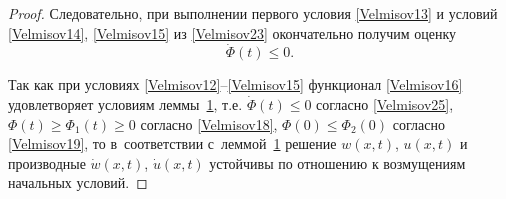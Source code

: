 \begin{proof}
Следовательно, при выполнении первого условия \eqref{Velmisov13} и условий \eqref{Velmisov14}, \eqref{Velmisov15} из \eqref{Velmisov23} окончательно получим оценку
\begin{equation} 
\label{Velmisov25} 
\dot{\Phi }(t)\le 0. 
\end{equation} 

Так как при условиях \eqref{Velmisov12}--\eqref{Velmisov15} функционал \eqref{Velmisov16} удовлетворяет условиям леммы~\hyperlink{Velm:lemma1}{1}, т.е. $\dot{\Phi }(t)\le 0$ согласно \eqref{Velmisov25}, $\Phi (t)\ge \Phi _{1} (t)\ge 0$ согласно \eqref{Velmisov18}, $\Phi (0)\le \Phi _{2} (0)$ согласно \eqref{Velmisov19}, то в~соответствии с~леммой~\hyperlink{Velm:lemma1}{1} решение $w(x,t)$, $u(x,t)$ и производные $\dot{w}(x,t)$, $\dot{u}(x,t)$ устойчивы по отношению к возмущениям начальных условий. \end{proof}

\smallskip

